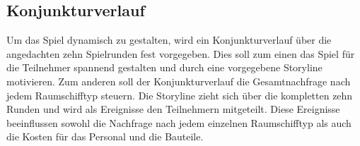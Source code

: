 \subsection{Konjunkturverlauf}
\label{sec:spielwelt-szenario-konjunkturverlauf}


Um das Spiel dynamisch zu gestalten, wird ein Konjunkturverlauf über die angedachten zehn Spielrunden fest vorgegeben. Dies soll zum einen das Spiel für die Teilnehmer spannend gestalten und durch eine vorgegebene Storyline motivieren. Zum anderen soll der Konjunkturverlauf die Gesamtnachfrage nach jedem Raumschifftyp steuern. Die Storyline zieht sich über die kompletten zehn Runden und wird als Ereignisse den Teilnehmern mitgeteilt. Diese Ereignisse beeinflussen sowohl die Nachfrage nach jedem einzelnen Raumschifftyp als auch die Kosten für das Personal und die Bauteile.

\autorende{}
